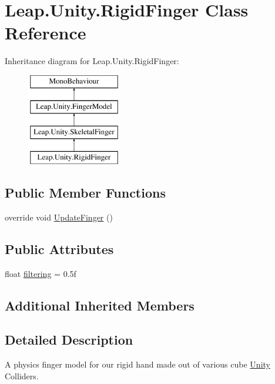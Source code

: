 \hypertarget{class_leap_1_1_unity_1_1_rigid_finger}{}\section{Leap.\+Unity.\+Rigid\+Finger Class Reference}
\label{class_leap_1_1_unity_1_1_rigid_finger}
Inheritance diagram for Leap.\+Unity.\+Rigid\+Finger\+:\begin{figure}[H]
\begin{center}
\leavevmode
\includegraphics[height=4.000000cm]{class_leap_1_1_unity_1_1_rigid_finger}
\end{center}
\end{figure}
\subsection*{Public Member Functions}
\begin{DoxyCompactItemize}
\item 
override void \mbox{\hyperlink{class_leap_1_1_unity_1_1_rigid_finger_a92ed755907bd1cc5213b6277d7e2227d}{Update\+Finger}} ()
\end{DoxyCompactItemize}
\subsection*{Public Attributes}
\begin{DoxyCompactItemize}
\item 
float \mbox{\hyperlink{class_leap_1_1_unity_1_1_rigid_finger_a865ffa7886e7a6802ecf73210db91db4}{filtering}} = 0.\+5f
\end{DoxyCompactItemize}
\subsection*{Additional Inherited Members}


\subsection{Detailed Description}
A physics finger model for our rigid hand made out of various cube \mbox{\hyperlink{namespace_leap_1_1_unity}{Unity}} Colliders. 

